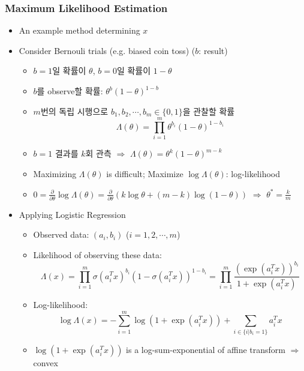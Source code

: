 \subsubsection*{Maximum Likelihood Estimation}
\begin{itemize}
    \item An example method determining $x$
    \item Consider Bernouli trials (e.g. biased coin toss) ($b$: result)
    \begin{itemize}
        \item $b=1$일 확률이 $\theta$, $b=0$일 확률이 $1-\theta$
        \item $b$를 observe할 확률: $\theta^b(1-\theta)^{1-b}$
        \item $m$번의 독립 시행으로 $b_1,b_2,\cdots,b_m\in\{0,1\}$을 관찰할 확률
        \begin{equation}
            \Lambda(\theta)=\prod_{i=1}^m\theta^{b_i}(1-\theta)^{1-b_i}
        \end{equation}
        \item $b=1$ 결과를 $k$회 관측 $\Rightarrow$ $\Lambda(\theta)=\theta^k(1-\theta)^{m-k}$
        \item Maximizing $\Lambda(\theta)$ is difficult; Maximize $\log\Lambda(\theta)$: log-likelihood
        \item $0=\frac\partial{\partial\theta}\log\Lambda(\theta)=\frac\partial{\partial\theta}\left(k\log\theta+(m-k)\log(1-\theta)\right)$ $\Rightarrow$ $\theta^\ast=\frac{k}{m}$
    \end{itemize}
    \item Applying Logistic Regression
    \begin{itemize}
        \item Observed data: $(a_i,b_i)$ ($i=1,2,\cdots,m$)
        \item Likelihood of observing these data:
        \begin{equation}
            \Lambda(x)=\prod_{i=1}^m\sigma(a_i^Tx)^{b_i}\left(1-\sigma(a_i^Tx)\right)^{1-b_i}=\prod_{i=1}^m\frac{\left(\exp(a_i^Tx)\right)^{b_i}}{1+\exp(a_i^Tx)}
        \end{equation}
        \item Log-likelihood:
        \begin{equation}
            \log\Lambda(x)=-\sum_{i=1}^m\log\left(1+\exp(a_i^Tx)\right)+\sum_{i\in\{i|b_i=1\}}a_i^Tx
        \end{equation}
        \item $\log\left(1+\exp(a_i^Tx)\right)$ is a log-sum-exponential of affine transform $\Rightarrow$ convex

\end{itemize}
\end{itemize}
